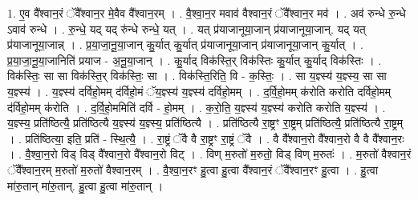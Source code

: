 \documentclass[17pt]{extarticle}
\begin{document}
1. ए॒व वै᳚श्वान॒रं ॅवै᳚श्वान॒र मे॒वैव वै᳚श्वान॒रम् । . वै॒श्वा॒न॒र मवाव॑ वैश्वान॒रं ॅवै᳚श्वान॒र मव॑ । . अव॑ रुन्धे रु॒न्धे ऽवाव॑ रुन्धे । . रु॒न्धे॒ यद् यद् रु॑न्धे रुन्धे॒ यत् । . यत् प्र॑याजानूया॒जान् प्र॑याजानूया॒जान्. यद् यत् प्र॑याजानूया॒जान्न् । . प्र॒या॒जा॒नू॒या॒जान् कु॒र्यात् कु॒र्यात् प्र॑याजानूया॒जान् प्र॑याजानूया॒जान् कु॒र्यात् । . प्र॒या॒जा॒नू॒या॒जानिति॑ प्रयाज - अ॒नू॒या॒जान् । . कु॒र्याद् विक॑स्ति॒र् विक॑स्तिः कु॒र्यात् कु॒र्याद् विक॑स्तिः । . विक॑स्तिः॒ सा सा विक॑स्ति॒र् विक॑स्तिः॒ सा । . विक॑स्ति॒रिति॒ वि - क॒स्तिः॒ । . सा य॒ज्ञ्स्य॑ य॒ज्ञ्स्य॒ सा सा य॒ज्ञ्स्य॑ । . य॒ज्ञ्स्य॑ दर्विहो॒मम् द॑र्विहो॒मं ॅय॒ज्ञ्स्य॑ य॒ज्ञ्स्य॑ दर्विहो॒मम् । . द॒र्वि॒हो॒मम् क॑रोति करोति दर्विहो॒मम् द॑र्विहो॒मम् क॑रोति । . द॒र्वि॒हो॒ममिति॑ दर्वि - हो॒मम् । . क॒रो॒ति॒ य॒ज्ञ्स्य॑ य॒ज्ञ्स्य॑ करोति करोति य॒ज्ञ्स्य॑ । . य॒ज्ञ्स्य॒ प्रति॑ष्ठित्यै॒ प्रति॑ष्ठित्यै य॒ज्ञ्स्य॑ य॒ज्ञ्स्य॒ प्रति॑ष्ठित्यै । . प्रति॑ष्ठित्यै रा॒ष्ट्रꣳ रा॒ष्ट्रम् प्रति॑ष्ठित्यै॒ प्रति॑ष्ठित्यै रा॒ष्ट्रम् । . प्रति॑ष्ठित्या॒ इति॒ प्रति॑ - स्थि॒त्यै॒ । . रा॒ष्ट्रं ॅवै वै रा॒ष्ट्रꣳ रा॒ष्ट्रं ॅवै । . वै वै᳚श्वान॒रो वै᳚श्वान॒रो वै वै वै᳚श्वान॒रः । . वै॒श्वा॒न॒रो विड् विड् वै᳚श्वान॒रो वै᳚श्वान॒रो विट् । . विण् म॒रुतो॑ म॒रुतो॒ विड् विण् म॒रुतः॑ । . म॒रुतो॑ वैश्वान॒रं ॅवै᳚श्वान॒रम् म॒रुतो॑ म॒रुतो॑ वैश्वान॒रम् । . वै॒श्वा॒न॒रꣳ हु॒त्वा हु॒त्वा वै᳚श्वान॒रं ॅवै᳚श्वान॒रꣳ हु॒त्वा । . हु॒त्वा मा॑रु॒तान् मा॑रु॒तान्. हु॒त्वा हु॒त्वा मा॑रु॒तान् । \newline
\end{document}
